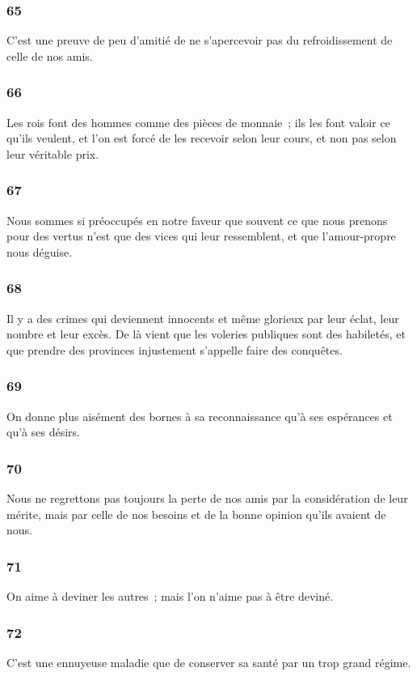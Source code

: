 \documentclass[french,twoside]{book} %
\begin{document}
\subsubsection[{65}]{ \textsc{65} }
\noindent C’est une preuve de peu d’amitié de ne s’apercevoir pas du refroidissement de celle de nos amis.
\subsubsection[{66}]{ \textsc{66} }
\noindent Les rois font des hommes comme des pièces de monnaie ; ils les font valoir ce qu’ils veulent, et l’on est forcé de les recevoir selon leur cours, et non pas selon leur véritable prix.
\subsubsection[{67}]{ \textsc{67} }
\noindent Nous sommes si préoccupés en notre faveur que souvent ce que nous prenons pour des vertus n’est que des vices qui leur ressemblent, et que l’amour-propre nous déguise.
\subsubsection[{68}]{ \textsc{68} }
\noindent Il y a des crimes qui deviennent innocents et même glorieux par leur éclat, leur nombre et leur excès. De là vient que les voleries publiques sont des habiletés, et que prendre des provinces injustement s’appelle faire des conquêtes.
\subsubsection[{69}]{ \textsc{69} }
\noindent On donne plus aisément des bornes à sa reconnaissance qu’à ses espérances et qu’à ses désirs.
\subsubsection[{70}]{ \textsc{70} }
\noindent Nous ne regrettons pas toujours la perte de nos amis par la considération de leur mérite, mais par celle de nos besoins et de la bonne opinion qu’ils avaient de nous.
\subsubsection[{71}]{ \textsc{71} }
\noindent On aime à deviner les autres ; mais l’on n’aime pas à être deviné.
\subsubsection[{72}]{ \textsc{72} }
\noindent C’est une ennuyeuse maladie que de conserver sa santé par un trop grand régime.
\end{document}
